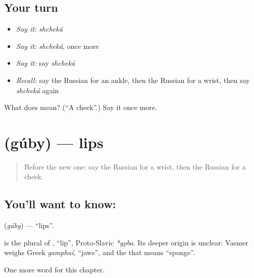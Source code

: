 \subsection*{Your turn}
\begin{itemize}
\raggedright
  \item \emph{Say it:} \emph{shcheká}
  \item \emph{Say it:} \emph{shcheká}, once more
  \item \emph{Say it:} say \emph{shcheká}
  \item \emph{Recall:} say the Russian for an ankle, then the Russian for a wrist, then say \emph{shcheká} again
\end{itemize}

\begin{tcolorbox}[breakable,colback=teal!4,colframe=teal!35!black,title={Before you move on}]
What does  mean? (\textquotedblleft{}A cheek\textquotedblright{}.) Say it once more.
\end{tcolorbox}
\section[\texorpdfstring{\ru{губы} (gúby)}{губы (gúby)}]{ (gúby) — lips}

\label{lesson:RU-C119-lips}



\begin{quote}
Before the new one: say the Russian for a wrist, then the Russian for a cheek.
\end{quote}

\subsection*{You'll want to know: }
\textbf{} (\emph{gúby}) — \textquotedblleft{}lips\textquotedblright{}.

\begin{cousinweb}
\textbf{} is the plural of \emph{}, \textquotedblleft{}lip\textquotedblright{}, Proto-Slavic \emph{*gǫba}. Its deeper origin is unclear: Vasmer weighs Greek \emph{gamphaí}, \textquotedblleft{}jaws\textquotedblright{}, and the \emph{} that means \textquotedblleft{}sponge\textquotedblright{}.
\end{cousinweb}

\begin{grammarlens}[title={What you've built}]
One more word for this chapter.
\end{grammarlens}

